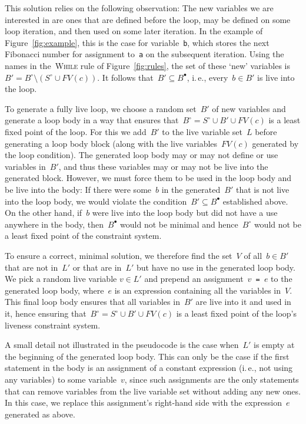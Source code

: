 \documentclass{llncs}
\newcommand{\liveout}[1]{\ensuremath{#1^{\circ}}}
\newcommand{\livein}[1]{\ensuremath{#1^{\bullet}}}
\def\union{\cup}
\begin{document}
This solution relies on the following observation: The new variables we are
interested in are ones that are defined before the loop, may be defined on
some loop iteration, and then used on some later iteration. In the example
of Figure~\ref{fig:example}, this is the case for variable~\verb|b|, which
stores the next Fibonacci number for assignment to~\verb|a| on the
subsequent iteration. Using the names in the~\textsc{While} rule of
Figure~\ref{fig:rules}, the set of these `new' variables is~\(B' =
\liveout{B} \setminus (\liveout{S} \union FV(c))\). It follows that~\(B'
\subseteq \livein{B}\), i.\,e., every~\(b \in B'\) is live into the loop.

To generate a fully live loop, we choose a random set~\(B'\) of new
variables and generate a loop body in a way that ensures that~\(\liveout{B}
= \liveout{S} \union B' \union FV(c)\) is a least fixed point of the loop.
For this we add~\(B'\) to the live variable set~\(L\)
before generating a loop body block (along with the live variables~\(FV(c)\)
generated by the loop condition). The generated loop body may or may not
define or use variables in~\(B'\), and thus these variables may or may not
be live into the generated block. However, we must force them to be used in
the loop body and be live into the body: If there were some~\(b\) in the
generated~\(B'\) that is not live into the loop body, we would violate the
condition~\(B' \subseteq \livein{B}\) established above. On the other hand,
if~\(b\) were live into the loop body but did not have a use anywhere in the
body, then~\(\livein{B}\) would not be minimal and hence~\(\liveout{B}\)
would not be a least fixed point of the constraint system.

To ensure a correct, minimal solution, we therefore find the set~\(V\) of
all~\(b \in B'\) that are not
in~\(L'\) or that are in~\(L'\) but have no use in the generated loop body.
We pick a random live variable \(v \in L'\) and prepend an
assignment~\(v\)\verb| = |\(e\) to the generated loop body, where~\(e\) is
an expression containing all the variables in~\(V\). This final loop body
ensures that all variables in~\(B'\) are live into it and used in it, hence
ensuring that~\(\liveout{B} = \liveout{S} \union B' \union FV(c)\) is a
least fixed point of the loop's liveness constraint system.

A small detail not illustrated in the pseudocode is the case when~\(L'\) is
empty at the beginning of the generated loop body. This can only be the case
if the first statement in the body is an assignment of a constant expression
(i.\,e., not using any variables) to some variable~\(v\), since such
assignments are the only statements that can remove variables from the live
variable set without adding any new ones. In this case, we replace this
assignment's right-hand side with the expression~\(e\) generated as above.
\end{document}
